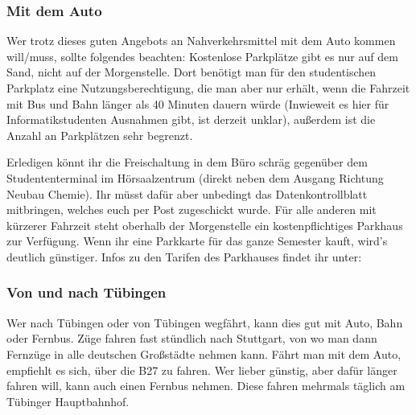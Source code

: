 \subsubsection*{Mit dem Auto}
Wer trotz dieses guten Angebots an Nahverkehrsmittel mit dem Auto kommen will/muss, sollte folgendes beachten: Kostenlose Parkplätze gibt es nur auf dem Sand, nicht auf der Morgenstelle.  Dort benötigt man für den studentischen Parkplatz eine Nutzungsberechtigung, die man aber nur erhält, wenn die Fahrzeit mit Bus und Bahn länger als 40 Minuten dauern würde (Inwieweit es hier für Informatikstudenten Ausnahmen gibt, ist derzeit unklar), außerdem ist die Anzahl an Parkplätzen sehr begrenzt.

 Erledigen könnt ihr die Freischaltung in dem Büro schräg gegenüber dem Studententerminal im Hörsaalzentrum (direkt neben dem Ausgang Richtung Neubau Chemie). Ihr müsst dafür aber unbedingt das Datenkontrollblatt mitbringen, welches euch per Post zugeschickt wurde. Für alle anderen mit kürzerer Fahrzeit steht oberhalb der Morgenstelle ein kostenpflichtiges Parkhaus zur Verfügung. Wenn ihr eine Parkkarte für das ganze Semester kauft, wird's deutlich günstiger. Infos zu den Tarifen des Parkhauses findet ihr unter:


\subsubsection*{Von und nach Tübingen}
Wer nach Tübingen oder von Tübingen wegfährt, kann dies gut mit Auto, Bahn oder Fernbus. Züge fahren fast stündlich nach Stuttgart, von wo man dann Fernzüge in alle deutschen Großstädte nehmen kann. Fährt man mit dem Auto, empfiehlt es sich, über die B27 zu fahren. Wer lieber günstig, aber dafür länger fahren will, kann auch einen Fernbus nehmen. Diese fahren mehrmals täglich am Tübinger Hauptbahnhof.
